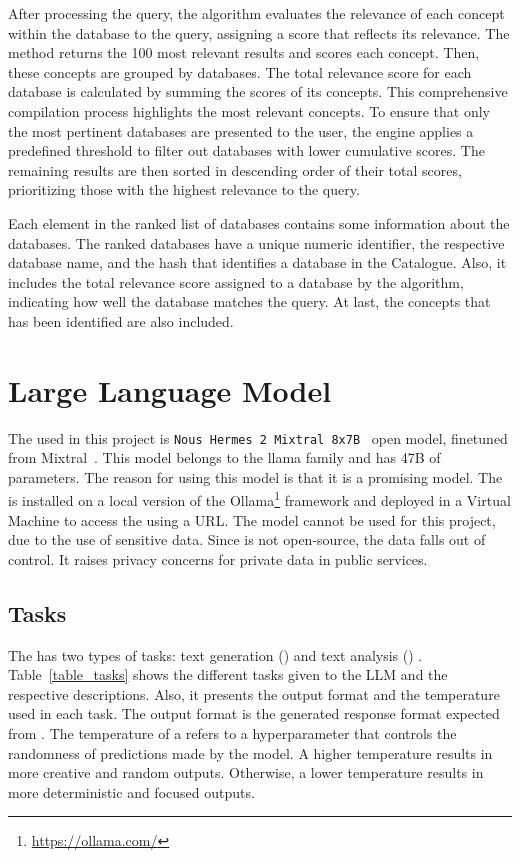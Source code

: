 After processing the query, the {\bm} algorithm evaluates the relevance of each concept within the database to the query, assigning a score that reflects its relevance. The method returns the 100 most relevant results and scores each concept. Then, these concepts are grouped by databases. The total relevance score for each database is calculated by summing the scores of its concepts. This comprehensive compilation process highlights the most relevant concepts. To ensure that only the most pertinent databases are presented to the user, the engine applies a predefined threshold to filter out databases with lower cumulative scores. The remaining results are then sorted in descending order of their total scores, prioritizing those with the highest relevance to the query.

Each element in the ranked list of databases contains some information about the databases. The ranked databases have a unique numeric identifier, the respective database name, and the hash that identifies a database in the {\ehden} Catalogue. Also, it includes the total relevance score assigned to a database by the {\bm} algorithm, indicating how well the database matches the query. At last, the concepts that has been identified are also included.



\section{Large Language Model}
\label{sec:llm}

The {\llm} used in this project is \texttt{Nous Hermes 2 Mixtral 8x7B}~\cite{Nous-Hermes-2-Mixtral-8x7B-DPO} open model, finetuned from Mixtral~\cite{jiang2024a}. This model belongs to the llama family and has 47B of parameters. The reason for using this {\llm} model is that it is a promising model. The {\llm} is installed on a local version of the Ollama\footnote{\url{https://ollama.com/}} framework and deployed in a Virtual Machine to access the {\llm} using a URL. The model {\gpt} cannot be used for this project, due to the use of sensitive data. Since {\gpt} is not open-source, the data falls out of control.  It raises privacy concerns for private data in public services.


\subsection{Tasks}

The {\llm} has two types of tasks: text generation ({\nlg}) and text analysis ({\nlu}) . Table~\ref{table_tasks} shows the different tasks given to the LLM and the respective descriptions. Also, it presents the output format and the temperature used in each task. The output format is the generated response format expected from {\llm}. The temperature of a {\llm} refers to a hyperparameter that controls the randomness of predictions made by the model. A higher temperature results in more creative and random outputs. Otherwise, a lower temperature results in more deterministic and focused outputs.

